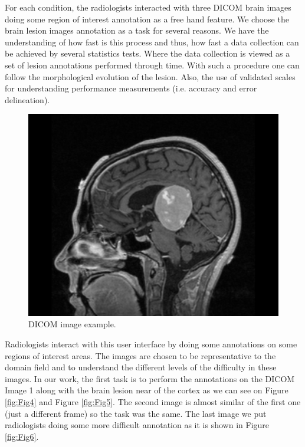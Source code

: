 \documentclass{sigchi}
\begin{document}
For each condition, the radiologists interacted with three DICOM brain images doing some region of interest annotation as a free hand feature. We choose the brain lesion images annotation as a task for several reasons. We have the understanding of how fast is this process and thus, how fast a data collection can be achieved by several statistics tests. Where the data collection is viewed as a set of lesion annotations performed through time. With such a procedure one can follow the morphological evolution of the lesion. Also, the use of validated scales for understanding performance measurements (i.e. accuracy and error delineation).

\begin{figure}[!h]
\centering
\includegraphics[width=0.9\columnwidth]{screen1}
\caption{DICOM image example.}
\label{fig:main_user_interface}
\end{figure}

Radiologists interact with this user interface by doing some annotations on some regions of interest areas. The images are chosen to be representative to the domain field and to understand the different levels of the difficulty in these images. In our work, the first task is to perform the annotations on the DICOM Image 1 along with the brain lesion near of the cortex as we can see on Figure \ref{fig:Fig4} and Figure \ref{fig:Fig5}. The second image is almost similar of the first one (just a different frame) so the task was the same. The last image we put radiologists doing some more difficult annotation as it is shown in Figure \ref{fig:Fig6}.
\end{document}
